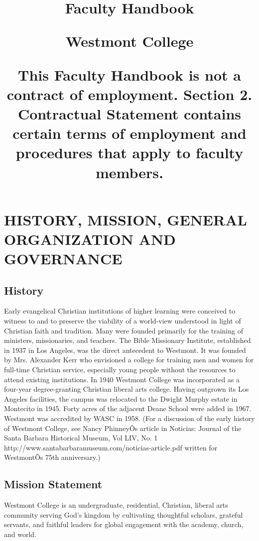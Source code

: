 \documentclass[letterpaper, 11pt]{article}
\date{}
\author{}
\title{\vspace*{2in} {\bfseries

Faculty Handbook

 Westmont College}
 
   
   This Faculty Handbook is not a contract of employment.
   Section 2. Contractual Statement contains 
certain terms of employment and procedures 
that apply to faculty members.
  
  
}
\begin{document}
\fancyhf{} %
\cfoot{\bf -- \thepage\ --}

\renewcommand{\contentsname}{Table of Contents}

\maketitle

\thispagestyle{empty}

\clearpage

\tableofcontents


\setcounter{page}{1}

\clearpage



\setcounter{page}{1} 

\section{HISTORY, MISSION, GENERAL ORGANIZATION AND GOVERNANCE}
\subsection{History}
   Early evangelical Christian institutions of higher learning were conceived to witness to and to preserve the viability of a world-view understood in light of Christian faith and tradition. Many were founded primarily for the training of ministers, missionaries, and teachers.
   The Bible Missionary Institute, established in 1937 in Los Angeles, was the direct antecedent to Westmont. It was founded by Mrs. Alexander Kerr who envisioned a college for training men and women for full-time Christian service, especially young people without the resources to attend existing institutions.
   In 1940 Westmont College was incorporated as a four-year degree-granting Christian liberal arts college. Having outgrown its Los Angeles facilities, the campus was relocated to the Dwight Murphy estate in Montecito in 1945. Forty acres of the adjacent Deane School were added in 1967. Westmont was accredited by WASC in 1958. (For a discussion of the early history of Westmont College, see Nancy PhinneyÕs article in Noticias: Journal of the Santa Barbara Historical Museum, Vol LIV, No. 1 http://www.santabarbaramuseum.com/noticias-article.pdf written for WestmontÕs 75th anniversary.)
\subsection{Mission Statement}
   Westmont College is an undergraduate, residential, Christian, liberal arts community serving God's kingdom by cultivating thoughtful scholars, grateful servants, and faithful leaders for global engagement with the academy, church, and world.
\end{document}
